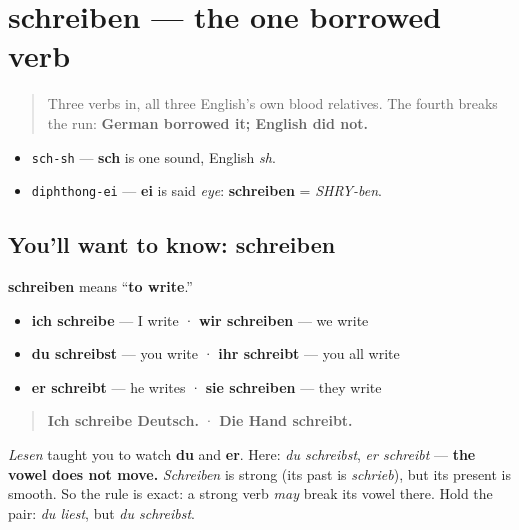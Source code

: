 \section[schreiben]{schreiben — the one borrowed verb}

\label{lesson:GE-C24-schreiben}



\begin{quote}
Three verbs in, all three English's own blood relatives. The fourth breaks the run: \textbf{German borrowed it; English did not.}
\end{quote}

\begin{sounds}
\begin{itemize}
\raggedright
  \item \texttt{sch-sh} — \textbf{sch} is one sound, English \emph{sh}.
  \item \texttt{diphthong-ei} — \textbf{ei} is said \emph{eye}: \textbf{schreiben} = \emph{SHRY-ben}.
\end{itemize}
\end{sounds}

\subsection*{You'll want to know: schreiben}
\textbf{schreiben} means \textquotedblleft{}\textbf{to write}.\textquotedblright{}

\begin{itemize}
\raggedright
  \item \textbf{ich schreibe} — I write · \textbf{wir schreiben} — we write
  \item \textbf{du schreibst} — you write · \textbf{ihr schreibt} — you all write
  \item \textbf{er schreibt} — he writes · \textbf{sie schreiben} — they write
\end{itemize}

\begin{quote}
\textbf{Ich schreibe Deutsch.} · \textbf{Die Hand schreibt.}
\end{quote}

\begin{grammarlens}[title={Grammar Lens: strong, but not here}]
\emph{Lesen} taught you to watch \textbf{du} and \textbf{er}. Here: \emph{du schreibst}, \emph{er schreibt} — \textbf{the vowel does not move.} \emph{Schreiben} is strong (its past is \emph{schrieb}), but its present is smooth. So the rule is exact: a strong verb \emph{may} break its vowel there. Hold the pair: \emph{du liest}, but \emph{du schreibst}.
\end{grammarlens}

